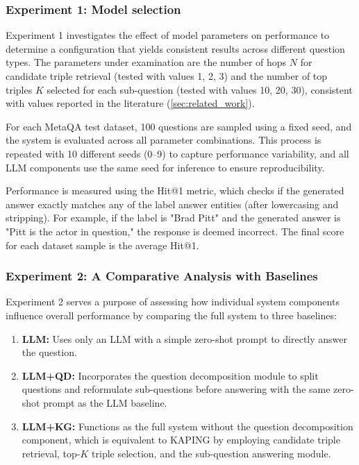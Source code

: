 \documentclass[pdflatex,sn-mathphys-num]{sn-jnl}%
\theoremstyle{thmstyleone}%
\theoremstyle{thmstyletwo}%
\theoremstyle{thmstylethree}%
\begin{document}
\subsubsection{Experiment 1: Model selection}  
Experiment 1 investigates the effect of model parameters on performance to determine a configuration that yields consistent results across different question types. The parameters under examination are the number of hops $N$ for candidate triple retrieval (tested with values 1, 2, 3) and the number of top triples $K$ selected for each sub-question (tested with values 10, 20, 30), consistent with values reported in the literature (\autoref{sec:related_work}).

For each MetaQA test dataset, 100 questions are sampled using a fixed seed, and the system is evaluated across all parameter combinations. This process is repeated with 10 different seeds (0–9) to capture performance variability, and all LLM components use the same seed for inference to ensure reproducibility.

Performance is measured using the Hit@1 metric, which checks if the generated answer exactly matches any of the label answer entities (after lowercasing and stripping). For example, if the label is "Brad Pitt" and the generated answer is "Pitt is the actor in question," the response is deemed incorrect. The final score for each dataset sample is the average Hit@1.

\subsubsection{Experiment 2: A Comparative Analysis with Baselines}
\label{sec:baselines}
Experiment 2 serves a purpose of assessing how individual system components influence overall performance by comparing the full system to three baselines:

\begin{enumerate}
    \item \textbf{LLM:} Uses only an LLM with a simple zero-shot prompt to directly answer the question.
    \item \textbf{LLM+QD:} Incorporates the question decomposition module to split questions and reformulate sub-questions before answering with the same zero-shot prompt as the LLM baseline.
    \item \textbf{LLM+KG:} Functions as the full system without the question decomposition component, which is equivalent to KAPING \cite{Baek2023} by employing candidate triple retrieval, top-$K$ triple selection, and the sub-question answering module.
\end{enumerate}
\end{document}
